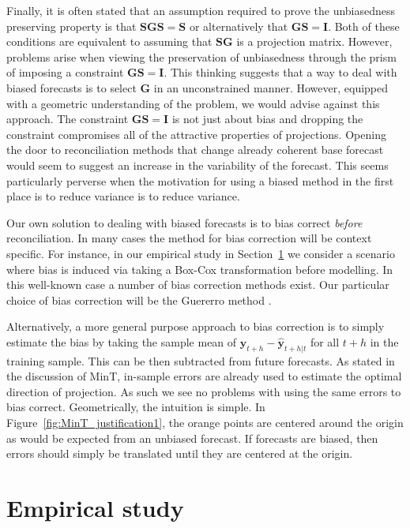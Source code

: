 \documentclass[12pt]{article}
\theoremstyle{definition}
\theoremstyle{property}
\begin{document}
	Finally, it is often stated that an assumption required to prove the unbiasedness preserving property is that $\bm{SGS}=\bm{S}$ or alternatively that $\bm{GS}=\bm{I}$.  Both of these conditions are equivalent to assuming that $\bm{SG}$ is a projection matrix.    However, problems arise when viewing the preservation of unbiasedness through the prism of imposing a constraint $\bm{GS}=\bm{I}$. This thinking suggests that a way to deal with biased forecasts is to select $\bm{G}$ in an unconstrained manner.  However, equipped with a geometric understanding of the problem, we would advise against this approach.  The constraint $\bm{GS}=\bm{I}$  is not just about bias and dropping the constraint compromises all of the attractive properties of projections.  Opening the door to reconciliation methods that change already coherent base forecast would seem to suggest an increase in the variability of the forecast.  This seems particularly perverse when the motivation for using a biased method in the first place is to reduce variance is to reduce variance. 
	
	Our own solution to dealing with biased forecasts is to bias correct {\em before} reconciliation.  In many cases the method for bias correction will be context specific.  For instance, in  our empirical study in Section~\ref{sec:EmpStudy} we consider a scenario where bias is induced via taking a Box-Cox transformation before modelling.  In this well-known case a number of bias correction methods exist.  Our particular choice of bias correction will be the Guererro method \citep{guerrero1993time}.
	
	Alternatively, a more general purpose approach to bias correction is to simply estimate the bias by taking the sample mean of $\bm{y
	}_{t+h}-\hat{\bm{y}}_{t+h|t}$ for all $t+h$ in the training sample.  This can be then subtracted from future forecasts.  As stated in the discussion of MinT, in-sample errors are already used to estimate the optimal direction of projection.  As such we see no problems with using the same errors to bias correct.  Geometrically, the intuition is simple.  In Figure~\ref{fig:MinT_justification1}, the orange points are centered around the origin as would be expected from an unbiased forecast.  If forecasts are biased, then errors should simply be translated until they are centered at the origin.
	
	\section{Empirical study} \label{sec:EmpStudy}
	
\end{document}
